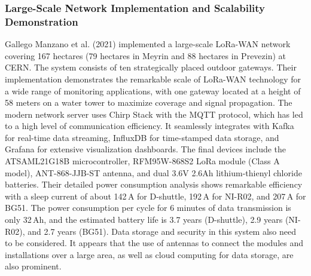\documentclass[conference]{IEEEtran}
\begin{document}
\subsubsection{Large-Scale Network Implementation and Scalability Demonstration}
Gallego Manzano et al. (2021) implemented a large-scale LoRa-WAN network covering 167 hectares (79 hectares in Meyrin and 88 hectares in Prevezin) at CERN. The system consists of ten strategically placed outdoor gateways. Their implementation demonstrates the remarkable scale of LoRa-WAN technology for a wide range of monitoring applications, with one gateway located at a height of 58 meters on a water tower to maximize coverage and signal propagation. The modern network server uses Chirp Stack with the MQTT protocol, which has led to a high level of communication efficiency. It seamlessly integrates with Kafka for real-time data streaming, InfluxDB for time-stamped data storage, and Grafana for extensive visualization dashboards. The final devices include the ATSAML21G18B microcontroller, RFM95W-868S2 LoRa module (Class A model), ANT-868-JJB-ST antenna, and dual 3.6V 2.6Ah lithium-thienyl chloride batteries. Their detailed power consumption analysis shows remarkable efficiency with a sleep current of about 142\,\textmu A for D-shuttle, 192\,\textmu A for NI-R02, and 207\,\textmu A for BG51. The power consumption per cycle for 6 minutes of data transmission is only 32\,\textmu Ah, and the estimated battery life is 3.7 years (D-shuttle), 2.9 years (NI-R02), and 2.7 years (BG51). Data storage and security in this system also need to be considered. It appears that the use of antennas to connect the modules and installations over a large area, as well as cloud computing for data storage, are also prominent.~\cite{manzano2021}
\end{document}
